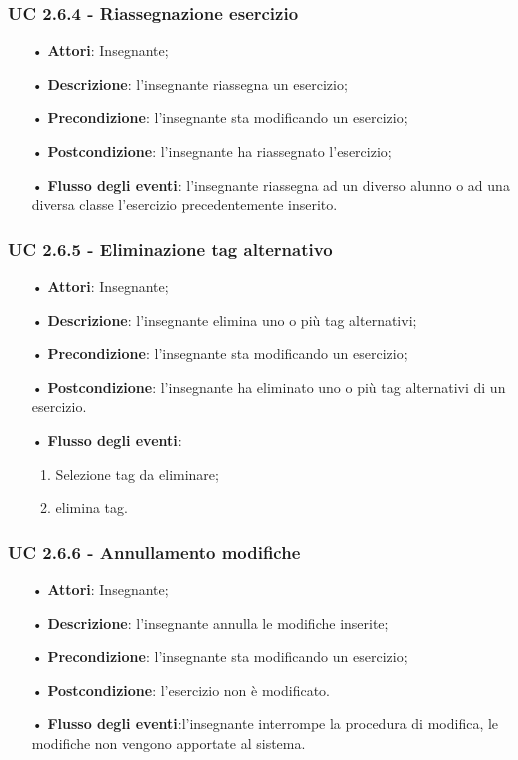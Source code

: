\subsubsection{UC 2.6.4 - Riassegnazione esercizio}
\begin{itemize}
	\item[•] \textbf{Attori}: Insegnante;
	\item[•] \textbf{Descrizione}: l'insegnante riassegna un esercizio;
	\item[•] \textbf{Precondizione}:  l'insegnante sta modificando un esercizio;
	\item[•] \textbf{Postcondizione}: l'insegnante ha riassegnato l'esercizio;
	\item[•] \textbf{Flusso degli eventi}: l'insegnante riassegna ad un diverso alunno o ad una diversa classe l'esercizio precedentemente inserito.
\end{itemize}


\subsubsection{UC 2.6.5 - Eliminazione tag alternativo}
\begin{itemize}
	\item[•] \textbf{Attori}: Insegnante;
	\item[•] \textbf{Descrizione}: l'insegnante elimina uno o più tag alternativi;
	\item[•] \textbf{Precondizione}: l'insegnante sta modificando un esercizio;
	\item[•] \textbf{Postcondizione}: l'insegnante ha eliminato uno o più tag alternativi di un esercizio.
	\item[•] \textbf{Flusso degli eventi}:
\begin{enumerate}
		\item Selezione tag da eliminare;
		\item elimina tag.
\end{enumerate}
\end{itemize}

\subsubsection{UC 2.6.6 - Annullamento modifiche}
\begin{itemize}
	\item[•] \textbf{Attori}: Insegnante;
	\item[•] \textbf{Descrizione}: l'insegnante annulla le modifiche inserite; 
	\item[•] \textbf{Precondizione}: l'insegnante sta modificando un esercizio;
	\item[•] \textbf{Postcondizione}: l'esercizio non è modificato.
	\item[•] \textbf{Flusso degli eventi}:l'insegnante interrompe la procedura di modifica, le modifiche non vengono apportate al sistema.
\end{itemize}

